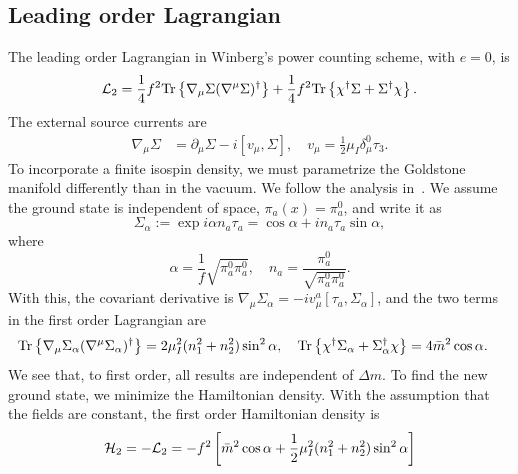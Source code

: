\subsection{Leading order Lagrangian}
\label{section: leading order}

The leading order Lagrangian in Winberg's power counting scheme, with $e = 0$, is
%
\begin{equation}
    \label{leading order two-flavor chpt lagrangian}
    \mathcal{L}_2 = 
    \frac{1}{4} f^2 \text{Tr} \left\{ \nabla_\mu \Sigma (\nabla^\mu \Sigma)^\dagger \right\}
    + \frac{1}{4} f^2 \text{Tr} \left\{ \chi^\dagger \Sigma + \Sigma^\dagger \chi \right\}.
\end{equation}
%
The external source currents are
\begin{align}
    \nabla_\mu \Sigma &= \partial_\mu \Sigma - i [v_\mu, \Sigma],
    \quad v_\mu = \frac{1}{2} \mu_I \delta_\mu^0 \tau_3.
\end{align}
To incorporate a finite isospin density, we must parametrize the Goldstone manifold differently than in the vacuum.
We follow the analysis in~\autocite{adhikariTwoflavorChiralPerturbation2019}.
We assume the ground state is independent of space, $\pi_a(x) = \pi_a^0$, and write it as
\begin{equation}
    \Sigma_\alpha 
    :=
    \exp{i \alpha n_a \tau_a}
    = 
    \cos \alpha + i n_a \tau_a \sin \alpha,
\end{equation}
%
where
\begin{equation}
    \alpha = \frac{1}{f} \sqrt{\pi^0_a \pi^0_a}, \quad
    n_a = \frac{\pi^0_a}{\sqrt{\pi^0_a \pi^0_a}}.
\end{equation}
%
With this, the covariant derivative is $\nabla_\mu \Sigma_\alpha = - iv^a_\mu [\tau_a, \Sigma_\alpha]$, and the two terms in the first order Lagrangian are
\begin{align}
    \text{Tr} \left\{ \nabla_\mu \Sigma_\alpha  (\nabla^\mu \Sigma_\alpha)^\dagger \right\}
    & = 2 \mu_I^2 (n_1^2 + n_2^2) \sin^2 \alpha, \quad
    \text{Tr} \left\{ \chi^\dagger \Sigma_\alpha + \Sigma_\alpha^\dagger \chi \right\}
    = 4 \bar m^2 \cos \alpha.
\end{align}
%
We see that, to first order, all results are independent of $\Delta m$.
To find the new ground state, we minimize the Hamiltonian density.
With the assumption that the fields are constant, the first order Hamiltonian density is
\begin{equation}
    \mathcal{H}_2 = - \mathcal{L}_2 = 
    - f^2 
    \left[
        \bar m^2 \cos\alpha 
        + \frac{1}{2} \mu_I^2 (n_1^2 + n_2^2 ) \sin^2 \alpha
    \right]
\end{equation}
